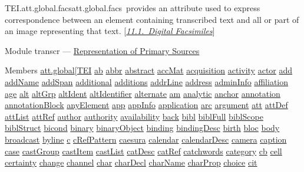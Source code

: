 \begin{reflist}
\item[]\begin{specHead}{TEI.att.global.facs}{att.global.facs} provides an attribute used to express correspondence between an element containing transcribed text and all or part of an image representing that text. [\textit{\hyperref[PHFAX]{11.1.\ Digital Facsimiles}}]\end{specHead} 
    \item[{Module}]
  transcr — \hyperref[PH]{Representation of Primary Sources}
    \item[{Members}]
  \hyperref[TEI.att.global]{att.global}[\hyperref[TEI.TEI]{TEI} \hyperref[TEI.ab]{ab} \hyperref[TEI.abbr]{abbr} \hyperref[TEI.abstract]{abstract} \hyperref[TEI.accMat]{accMat} \hyperref[TEI.acquisition]{acquisition} \hyperref[TEI.activity]{activity} \hyperref[TEI.actor]{actor} \hyperref[TEI.add]{add} \hyperref[TEI.addName]{addName} \hyperref[TEI.addSpan]{addSpan} \hyperref[TEI.additional]{additional} \hyperref[TEI.additions]{additions} \hyperref[TEI.addrLine]{addrLine} \hyperref[TEI.address]{address} \hyperref[TEI.adminInfo]{adminInfo} \hyperref[TEI.affiliation]{affiliation} \hyperref[TEI.age]{age} \hyperref[TEI.alt]{alt} \hyperref[TEI.altGrp]{altGrp} \hyperref[TEI.altIdent]{altIdent} \hyperref[TEI.altIdentifier]{altIdentifier} \hyperref[TEI.alternate]{alternate} \hyperref[TEI.am]{am} \hyperref[TEI.analytic]{analytic} \hyperref[TEI.anchor]{anchor} \hyperref[TEI.annotation]{annotation} \hyperref[TEI.annotationBlock]{annotationBlock} \hyperref[TEI.anyElement]{anyElement} \hyperref[TEI.app]{app} \hyperref[TEI.appInfo]{appInfo} \hyperref[TEI.application]{application} \hyperref[TEI.arc]{arc} \hyperref[TEI.argument]{argument} \hyperref[TEI.att]{att} \hyperref[TEI.attDef]{attDef} \hyperref[TEI.attList]{attList} \hyperref[TEI.attRef]{attRef} \hyperref[TEI.author]{author} \hyperref[TEI.authority]{authority} \hyperref[TEI.availability]{availability} \hyperref[TEI.back]{back} \hyperref[TEI.bibl]{bibl} \hyperref[TEI.biblFull]{biblFull} \hyperref[TEI.biblScope]{biblScope} \hyperref[TEI.biblStruct]{biblStruct} \hyperref[TEI.bicond]{bicond} \hyperref[TEI.binary]{binary} \hyperref[TEI.binaryObject]{binaryObject} \hyperref[TEI.binding]{binding} \hyperref[TEI.bindingDesc]{bindingDesc} \hyperref[TEI.birth]{birth} \hyperref[TEI.bloc]{bloc} \hyperref[TEI.body]{body} \hyperref[TEI.broadcast]{broadcast} \hyperref[TEI.byline]{byline} \hyperref[TEI.c]{c} \hyperref[TEI.cRefPattern]{cRefPattern} \hyperref[TEI.caesura]{caesura} \hyperref[TEI.calendar]{calendar} \hyperref[TEI.calendarDesc]{calendarDesc} \hyperref[TEI.camera]{camera} \hyperref[TEI.caption]{caption} \hyperref[TEI.case]{case} \hyperref[TEI.castGroup]{castGroup} \hyperref[TEI.castItem]{castItem} \hyperref[TEI.castList]{castList} \hyperref[TEI.catDesc]{catDesc} \hyperref[TEI.catRef]{catRef} \hyperref[TEI.catchwords]{catchwords} \hyperref[TEI.category]{category} \hyperref[TEI.cb]{cb} \hyperref[TEI.cell]{cell} \hyperref[TEI.certainty]{certainty} \hyperref[TEI.change]{change} \hyperref[TEI.channel]{channel} \hyperref[TEI.char]{char} \hyperref[TEI.charDecl]{charDecl} \hyperref[TEI.charName]{charName} \hyperref[TEI.charProp]{charProp} \hyperref[TEI.choice]{choice} \hyperref[TEI.cit]{cit} 
\end{reflist}
